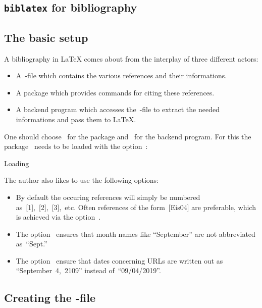 \begin{refsection}
\section{\texttt{biblatex} for bibliography}



\subsection{The basic setup}

A bibliography in {\LaTeX} comes about from the interplay of three different actors:
\begin{itemize}
  \item
    A~-file which contains the various references and their informations.
  \item
    A package which provides commands for citing these references.
  \item
    A backend program which accesses the~-file to extract the needed informations and pass them to {\LaTeX}.
\end{itemize}

One should choose~ for the package and~ for the backend program.
For this the package~ needs to be loaded with the option~:
\begin{showcode}{Loading }
\usepackage[backend = biber]{biblatex}
\end{showcode}
The author also likes to use the following options:
\begin{itemize}
  \item
    By default the occuring references will simply be numbered as~[1],~[2],~[3],~etc\@.
    Often references of the form~[Eis04] are preferable, which is achieved via the option~.
  \item
    The option~ ensures that month names like \enquote{September} are not abbreviated as~\enquote{Sept.}
  \item
    The option~ ensure that dates concerning URLs are written out as \enquote{September~4,~2109} instead of~\enquote{09/04/2019}.
\end{itemize}



\subsection{Creating the \texorpdfstring{}{bib}-file}


\end{refsection}

